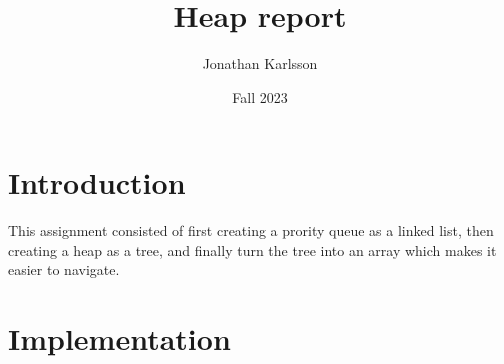 \documentclass[a4paper,11pt]{article}
\begin{document}
\title{
    \textbf{Heap report}
}
\author{Jonathan Karlsson}
\date{Fall 2023}

\maketitle

\section*{Introduction}
This assignment consisted of first creating a prority queue as a linked list, then creating a heap as a tree, and finally turn the tree into an array 
which makes it easier to navigate.


\section*{Implementation}
\end{document}
